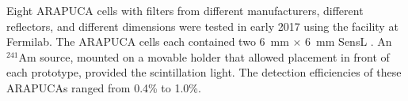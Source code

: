 \subsubsection{}



Eight %
ARAPUCA cells with filters from different manufacturers, different reflectors, and different dimensions were tested in early 2017 using the  facility at Fermilab.  
The ARAPUCA cells each contained two \SI{6}{mm} $\times$ \SI{6}{mm} SensL . 
An $^{241}$Am source, mounted on a movable holder that allowed placement in front of each prototype, provided the scintillation light. The detection efficiencies of these ARAPUCAs ranged from 0.4\% to 1.0\%.

